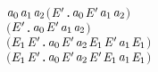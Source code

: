 \begin{itemize}
\begin{alltt}
       \ensuremath{\HOLBoundVar{a}\sb{\mathrm{0}}} \HOLSymConst{\ensuremath{=}} \ensuremath{\HOLBoundVar{a}\sb{\mathrm{1}}}\HOLSymConst{\ensuremath{\ldotp}}\ensuremath{\HOLBoundVar{a}\sb{\mathrm{2}}} \HOLSymConst{\HOLTokenDisj{}} \ensuremath{(}\HOLSymConst{\HOLTokenExists{}} \ensuremath{\HOLBoundVar{E}\sp{\prime}}. \ensuremath{\HOLBoundVar{a}\sb{\mathrm{0}}} \HOLSymConst{\ensuremath{=}}  \HOLSymConst{\ensuremath{+}} \ensuremath{\HOLBoundVar{E}\sp{\prime}} \HOLSymConst{\HOLTokenConj{}}  \HOLTokenTransBegin\ensuremath{\HOLBoundVar{a}\sb{\mathrm{1}}}\HOLTokenTransEnd \ensuremath{\HOLBoundVar{a}\sb{\mathrm{2}}}\ensuremath{)} \HOLSymConst{\HOLTokenDisj{}}
       \ensuremath{(}\HOLSymConst{\HOLTokenExists{}} \ensuremath{\HOLBoundVar{E}\sp{\prime}}. \ensuremath{\HOLBoundVar{a}\sb{\mathrm{0}}} \HOLSymConst{\ensuremath{=}} \ensuremath{\HOLBoundVar{E}\sp{\prime}} \HOLSymConst{\ensuremath{+}}  \HOLSymConst{\HOLTokenConj{}}  \HOLTokenTransBegin\ensuremath{\HOLBoundVar{a}\sb{\mathrm{1}}}\HOLTokenTransEnd \ensuremath{\HOLBoundVar{a}\sb{\mathrm{2}}}\ensuremath{)} \HOLSymConst{\HOLTokenDisj{}}
       \ensuremath{(}\HOLSymConst{\HOLTokenExists{}} \ensuremath{\HOLBoundVar{E}\sb{\mathrm{1}}} \ensuremath{\HOLBoundVar{E}\sp{\prime}}. \ensuremath{\HOLBoundVar{a}\sb{\mathrm{0}}} \HOLSymConst{\ensuremath{=}}  \HOLSymConst{\ensuremath{\mid}} \ensuremath{\HOLBoundVar{E}\sp{\prime}} \HOLSymConst{\HOLTokenConj{}} \ensuremath{\HOLBoundVar{a}\sb{\mathrm{2}}} \HOLSymConst{\ensuremath{=}} \ensuremath{\HOLBoundVar{E}\sb{\mathrm{1}}} \HOLSymConst{\ensuremath{\mid}} \ensuremath{\HOLBoundVar{E}\sp{\prime}} \HOLSymConst{\HOLTokenConj{}}  \HOLTokenTransBegin\ensuremath{\HOLBoundVar{a}\sb{\mathrm{1}}}\HOLTokenTransEnd \ensuremath{\HOLBoundVar{E}\sb{\mathrm{1}}}\ensuremath{)} \HOLSymConst{\HOLTokenDisj{}}
       \ensuremath{(}\HOLSymConst{\HOLTokenExists{}} \ensuremath{\HOLBoundVar{E}\sb{\mathrm{1}}} \ensuremath{\HOLBoundVar{E}\sp{\prime}}. \ensuremath{\HOLBoundVar{a}\sb{\mathrm{0}}} \HOLSymConst{\ensuremath{=}} \ensuremath{\HOLBoundVar{E}\sp{\prime}} \HOLSymConst{\ensuremath{\mid}}  \HOLSymConst{\HOLTokenConj{}} \ensuremath{\HOLBoundVar{a}\sb{\mathrm{2}}} \HOLSymConst{\ensuremath{=}} \ensuremath{\HOLBoundVar{E}\sp{\prime}} \HOLSymConst{\ensuremath{\mid}} \ensuremath{\HOLBoundVar{E}\sb{\mathrm{1}}} \HOLSymConst{\HOLTokenConj{}}  \HOLTokenTransBegin\ensuremath{\HOLBoundVar{a}\sb{\mathrm{1}}}\HOLTokenTransEnd \ensuremath{\HOLBoundVar{E}\sb{\mathrm{1}}}\ensuremath{)} \HOLSymConst{\HOLTokenDisj{}}

\end{alltt}
\end{itemize}
